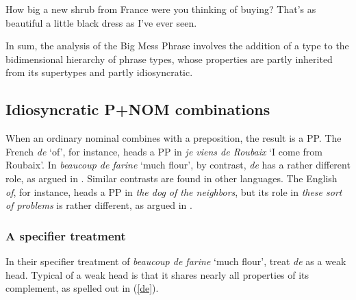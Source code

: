 \documentclass[output=paper
	        ,collection
	        ,collectionchapter
 	        ,biblatex
                ,babelshorthands
                ,newtxmath
                ,draftmode
                ,colorlinks, citecolor=brown
]{langscibook}
\begin{document}
\begin{exe} 
\ex\label{shrub} 
\begin{xlist} 
\ex  How big a new shrub from France were you thinking of buying? 
\ex  That's as beautiful a little black dress as I've ever seen.  
\end{xlist} 
\end{exe} 

In sum, the analysis of the Big Mess Phrase involves the addition of 
a type to the bidimensional hierarchy of phrase types, whose properties 
are partly inherited from its supertypes and partly idiosyncratic.      


\subsection{Idiosyncratic P+NOM combinations} 
\label{prep}


When an ordinary nominal combines with a preposition, the result is a PP. 
The French \emph{de} `of', for instance, heads a PP in 
\emph{je viens de Roubaix} `I come from Roubaix'. 
In \emph{beaucoup de farine} `much flour', by contrast, \emph{de} has 
a rather different role, as argued in \citet{Abeilleetal04}. 
Similar contrasts are found in other languages. The English \emph{of}, for instance, 
heads a PP in \emph{the dog of the neighbors}, but its role in \emph{these sort of problems} 
is rather different, as argued in \citet{Maekawa15}.  


\subsubsection{A specifier treatment} 


In their specifier treatment of \emph{beaucoup de farine} `much flour',  
\citet{Abeilleetal04} treat \emph{de} as a weak head. 
Typical of a weak head is that it shares 
nearly all properties of its complement, as spelled out in (\ref{de}).

\begin{exe} 
\ex\label{de} 
\end{exe} 
\end{document}
